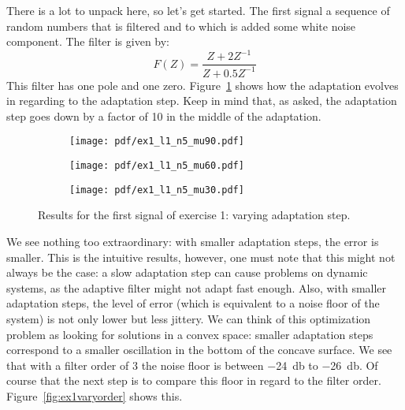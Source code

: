 There is a lot to unpack here, so let's get started. The first signal a sequence
of random numbers that is filtered and to which is added some white noise
component. The filter is given by:
\begin{equation}
    F(Z) = \frac{Z+2Z^{-1}}{Z+0.5Z^{-1}}
\end{equation}
This filter has one pole and one zero. Figure~\ref{fig:ex1varystep} shows how the
adaptation evolves in regarding to the adaptation step. Keep in mind that, as
asked, the adaptation step goes down by a factor of 10 in the middle of the
adaptation.
\begin{figure}[h]
    \centering
    \begin{subfigure}[t]{0.30\columnwidth}
        \centering
        \texttt{[image: pdf/ex1\_l1\_n5\_mu90.pdf]}
        \caption{}
    \end{subfigure} \hfill
    \begin{subfigure}[t]{0.30\columnwidth}
        \centering
        \texttt{[image: pdf/ex1\_l1\_n5\_mu60.pdf]}
        \caption{}
    \end{subfigure} \hfill
    \begin{subfigure}[t]{0.30\columnwidth}
        \centering
        \texttt{[image: pdf/ex1\_l1\_n5\_mu30.pdf]}
        \caption{}
    \end{subfigure}
    \caption{Results for the first signal of exercise 1: varying adaptation
        step.\label{fig:ex1varystep}}
\end{figure}
We see nothing too extraordinary: with smaller adaptation steps, the error is
smaller. This is the intuitive results, however, one must note that this might not
always be the case: a slow adaptation step can cause problems on dynamic systems,
as the adaptive filter might not adapt fast enough. Also, with smaller adaptation
steps, the level of error (which is equivalent to a noise floor of the system) is
not only lower but less jittery. We can think of this optimization problem as
looking for solutions in a convex space: smaller adaptation steps correspond to a
smaller oscillation in the bottom of the concave surface. We see that with a
filter order of 3 the noise floor is between \SI{-24}{\decibel} to
\SI{-26}{\decibel}. Of course that the next step is to compare this floor in
regard to the filter order. Figure~\ref{fig:ex1varyorder} shows this.
